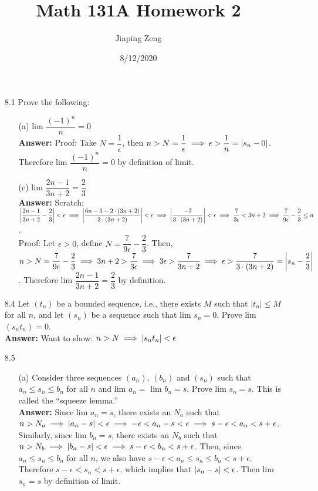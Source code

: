 \documentclass{article}
\title{Math 131A Homework 2}
\date{8/12/2020}
\author{Jiaping Zeng}
\begin{document}
\maketitle

\begin{itemize}
    \item [8.1] Prove the following:
          \begin{itemize}
              \item [(a)] lim $\dfrac{(-1)^n}{n}=0$\\
                    \textbf{Answer: } Proof: Take $N=\dfrac{1}{\epsilon}$, then $n>N=\dfrac{1}{\epsilon}\implies\epsilon>\dfrac{1}{n}=\abs{s_n-0}$. Therefore lim $\dfrac{(-1)^n}{n}=0$ by definition of limit.
              \item [(c)] lim $\dfrac{2n-1}{3n+2}=\dfrac{2}{3}$\\
                    \textbf{Answer: }
                    Scratch: $\abs{\dfrac{2n-1}{3n+2}-\dfrac{2}{3}}<\epsilon\implies\abs{\dfrac{6n-3-2\cdot(3n+2)}{3\cdot(3n+2)}}<\epsilon\implies\abs{\dfrac{-7}{3\cdot(3n+2)}}<\epsilon\implies\dfrac{7}{3\epsilon}<3n+2\implies\dfrac{7}{9\epsilon}-\dfrac{2}{3}\leq n$.\\
                    Proof: Let $\epsilon>0$, define $N=\dfrac{7}{9\epsilon}-\dfrac{2}{3}$. Then, $n>N=\dfrac{7}{9\epsilon}-\dfrac{2}{3}\implies 3n+2>\dfrac{7}{3\epsilon}\implies 3\epsilon>\dfrac{7}{3n+2}\implies\epsilon>\dfrac{7}{3\cdot(3n+2)}=\abs{s_n-\dfrac{2}{3}}$. Therefore lim $\dfrac{2n-1}{3n+2}=\dfrac{2}{3}$ by definition.
          \end{itemize}
    \item [8.4] Let $(t_n)$ be a bounded sequence, i.e., there exists $M$ such that $|t_n|\leq M$ for all $n$, and let $(s_n)$ be a sequence such that lim $s_n=0$. Prove lim $(s_nt_n)=0$.\\
          \textbf{Answer: } Want to show: $n>N\implies \abs{s_nt_n}<\epsilon$
    \item [8.5]
          \begin{itemize}
              \item [(a)] Consider three sequences $(a_n)$, $(b_n)$ and $(s_n)$ such that $a_n\leq s_n\leq b_n$ for all $n$ and lim $a_n=$ lim $b_n=s$. Prove lim $s_n=s$. This is called the ``squeeze lemma.''\\
                    \textbf{Answer: } Since lim $a_n=s$, there exists an $N_a$ such that $n>N_a\implies\abs{a_n-s}<\epsilon\implies -\epsilon<a_n-s<\epsilon \implies s-\epsilon<a_n<s+\epsilon$. Similarly, since lim $b_n=s$, there exists an $N_b$ such that $n>N_b\implies\abs{b_n-s}<\epsilon\implies s-\epsilon<b_n<s+\epsilon$. Then, since $a_n\leq s_n\leq b_n$ for all $n$, we also have $s-\epsilon<a_n\leq s_n\leq b_n<s+\epsilon$. Therefore $s-\epsilon<s_n<s+\epsilon$, which implies that $\abs{s_n-s}<\epsilon$. Then lim $s_n=s$ by definition of limit.

\end{itemize}
\end{itemize}
\end{document}
